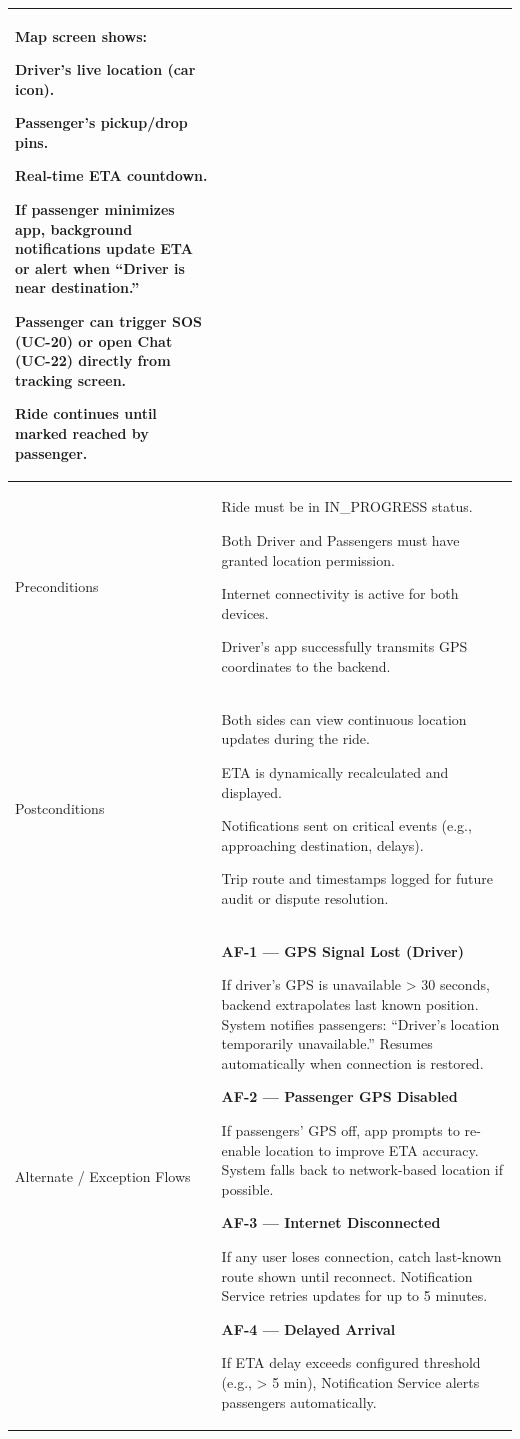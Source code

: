 \begin{longtable}{|p{3.5cm}|p{12cm}|}
Map screen shows:

Driver’s live location (car icon).

Passenger’s pickup/drop pins.

Real-time ETA countdown.

If passenger minimizes app, background notifications update ETA or alert when “Driver is near destination.”

Passenger can trigger SOS (UC-20) or open Chat (UC-22) directly from tracking screen.

Ride continues until marked reached by passenger. \\
\hline
Preconditions &
Ride must be in IN\_PROGRESS status.

Both Driver and Passengers must have granted location permission.

Internet connectivity is active for both devices.

Driver’s app successfully transmits GPS coordinates to the backend. \\
\hline
Postconditions &
Both sides can view continuous location updates during the ride.

ETA is dynamically recalculated and displayed.

Notifications sent on critical events (e.g., approaching destination, delays).

Trip route and timestamps logged for future audit or dispute resolution. \\
\hline
Alternate / Exception Flows &
\textbf{AF-1 --- GPS Signal Lost (Driver)}

If driver’s GPS is unavailable > 30 seconds, backend extrapolates last known position. System notifies passengers: “Driver’s location temporarily unavailable.” Resumes automatically when connection is restored.

\textbf{AF-2 --- Passenger GPS Disabled}

If passengers’ GPS off, app prompts to re-enable location to improve ETA accuracy. System falls back to network-based location if possible.

\textbf{AF-3 --- Internet Disconnected}

If any user loses connection, catch last-known route shown until reconnect. Notification Service retries updates for up to 5 minutes.

\textbf{AF-4 --- Delayed Arrival}

If ETA delay exceeds configured threshold (e.g., > 5 min), Notification Service alerts passengers automatically.


\end{longtable}
